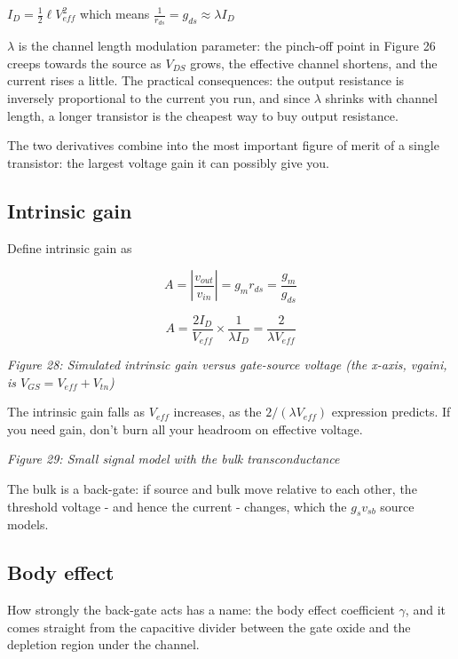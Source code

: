 \(I_D = \frac{1}{2} \ell V_{eff}^2\) which means
\(\frac{1}{r_{ds}} = g_{ds} \approx \lambda I_D\)

\(\lambda\) is the channel length modulation parameter: the pinch-off
point in Figure 26 creeps towards the source as \(V_{DS}\) grows, the
effective channel shortens, and the current rises a little. The
practical consequences: the output resistance is inversely proportional
to the current you run, and since \(\lambda\) shrinks with channel
length, a longer transistor is the cheapest way to buy output
resistance.

The two derivatives combine into the most important figure of merit of a
single transistor: the largest voltage gain it can possibly give you.

\subsection{Intrinsic gain}\label{intrinsic-gain}

Define intrinsic gain as

\[ A = \left\vert \frac{v_{out}}{v_{in}}\right\vert =  g_m r_{ds} = \frac{g_m}{g_{ds}}  \]

\[ A  =  \frac{2 I_D}{V_{eff}} \times \frac{1}{ \lambda I_D } = \frac{2}{\lambda V_{eff}}  \]


{
\centering
{}
}

\emph{Figure 28: Simulated intrinsic gain versus gate-source voltage
(the x-axis, vgaini, is \(V_{GS} = V_{eff} + V_{tn}\))}

The intrinsic gain falls as \(V_{eff}\) increases, as the
\(2/(\lambda V_{eff})\) expression predicts. If you need gain, don't
burn all your headroom on effective voltage.


{
\centering
{}
}

\emph{Figure 29: Small signal model with the bulk transconductance}

The bulk is a back-gate: if source and bulk move relative to each other,
the threshold voltage - and hence the current - changes, which the
\(g_s v_{sb}\) source models.

\subsection{Body effect}\label{body-effect}

How strongly the back-gate acts has a name: the body effect coefficient
\(\gamma\), and it comes straight from the capacitive divider between
the gate oxide and the depletion region under the channel.

